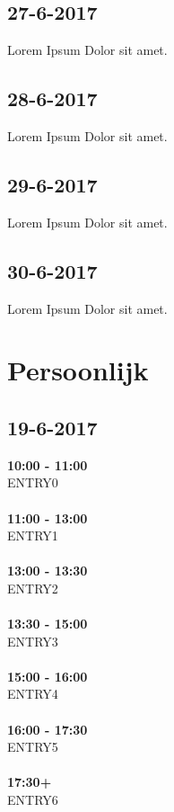 \documentclass{uva-inf-article}
\begin{document}
\subsection{27-6-2017}
Lorem Ipsum Dolor sit amet.
\subsection{28-6-2017}
Lorem Ipsum Dolor sit amet.
\subsection{29-6-2017}
Lorem Ipsum Dolor sit amet.
\subsection{30-6-2017}
Lorem Ipsum Dolor sit amet.

\section{Persoonlijk}
\subsection{19-6-2017}
\textbf{10:00 - 11:00}\\
ENTRY0\\\\
\textbf{11:00 - 13:00}\\
ENTRY1\\\\
\textbf{13:00 - 13:30}\\
ENTRY2\\\\
\textbf{13:30 - 15:00}\\
ENTRY3\\\\
\textbf{15:00 - 16:00}\\
ENTRY4\\\\
\textbf{16:00 - 17:30}\\
ENTRY5\\\\
\textbf{17:30+}\\
ENTRY6\\
\end{document}
